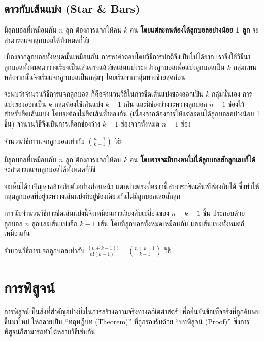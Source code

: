 \newpage

\subsection{ดาวกับเส้นแบ่ง (Star \& Bars)}
\begin{example}
มีลูกบอลที่เหมือนกัน $n$ ลูก ต้องการแจกให้คน $k$ คน \textbf{โดยแต่ละคนต้องได้ลูกบอลอย่างน้อย 1 ลูก} จะสามารถแจกลูกบอลได้ทั้งหมดกี่วิธี

เนื่องจากลูกบอลทั้งหมดนั้นเหมือนกัน การหาคำตอบโดยวิธีการปกติจึงเป็นไปได้ยาก เราจึงใช้วิธีนำลูกบอลทั้งหมดมาวางเรียงเป็นเส้นตรงแล้วขีดเส้นแบ่งระหว่างลูกบอลเพื่อแบ่งลูกบอลเป็น $k$ กลุ่มแทน หลังจากนั้นจึงเริ่มแจกลูกบอลเป็นกลุ่มๆ โดยเริ่มจากกลุ่มทางซ้ายสุดก่อน

จะพบว่าจำนวนวิธีการแจกลูกบอล ก็คือจำนวนวิธีในการขีดเส้นแบ่งของออกเป็น $k$ กลุ่มนั่นเอง การแบ่งของออกเป็น $k$ กลุ่มต้องใช้เส้นแบ่ง $k-1$ เส้น และมีช่องว่างระหว่างลูกบอล $n-1$ ช่องไว้สำหรับขีดเส้นแบ่ง โดยจะต้องไม่ขีดเส้นซ้ำช่องกัน (เนื่องจากต้องการให้แต่ละคนได้ลูกบอลอย่างน้อย 1 ชิ้น) จำนวนวิธีจึงเป็นการเลือกช่องว่าง $k-1$ ช่องจากทั้งหมด $n-1$ ช่อง
\begin{center}
จำนวนวิธีการแจกลูกบอลเท่ากับ $\binom{n-1}{k-1}$ วิธี
\end{center}
\end{example}

\begin{example}
มีลูกบอลที่เหมือนกัน $n$ ลูก ต้องการแจกให้คน $k$ คน \textbf{โดยอาจจะมีบางคนไม่ได้ลูกบอลสักลูกเลยก็ได้} จะสามารถแจกลูกบอลได้ทั้งหมดกี่วิธี

จะเห็นได้ว่าปัญหาคล้ายกับตัวอย่างก่อนหน้า แตกต่างตรงที่คราวนี้สามารถขีดเส้นซำ้ช่องกันได้ ซึ่งทำให้กลุ่มลูกบอลที่อยู่ระหว่างเส้นแบ่งที่อยู่ช่องเดียวกันไม่มีลูกบอลเลยสักลูก

การนับจำนวนวิธีการขีดเส้นแบ่งนี้จึงเหมือนการเรียงสับเปลี่ยนของ $n+k-1$ ชิ้น ประกอบด้วยลูกบอล $n$ ลูกและเส้นแบ่งอีก $k-1$ เส้น โดยที่ลูกบอลทั้งหมดเหมือนกัน และเส้นแบ่งทั้งหมดก็เหมือนกัน
\begin{center}
จำนวนวิธีการแจกลูกบอลเท่ากับ $\frac{(n+k-1)!}{n!(k-1)!} = \binom{n+k-1}{k-1}$ วิธี
\end{center}
\end{example}

\section{การพิสูจน์}

การพิสูจน์เป็นสิ่งที่สำคัญอย่างยิ่งในการสร้างความจริงทางคณิตศาสตร์ เพื่อยืนยันข้อเท็จจริงที่ถูกค้นพบขึ้นมาใหม่ ให้กลายเป็น ``ทฤษฎีบท (Theorem)'' ที่ถูกรองรับด้วย ``บทพิสูจน์ (Proof)'' ซึ่งการพิสูจน์ก็สามารถทำได้หลายวิธีเช่นกัน

